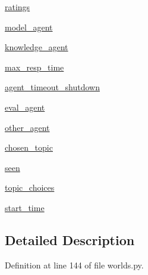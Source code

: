 \begin{DoxyCompactItemize}
\item 
\hyperlink{classprojects_1_1wizard__of__wikipedia_1_1mturk__evaluation__task_1_1worlds_1_1WizardEval_aacc518b7e3a5c1b7f937592864ae5e2d}{ratings}
\item 
\hyperlink{classprojects_1_1wizard__of__wikipedia_1_1mturk__evaluation__task_1_1worlds_1_1WizardEval_a55e5a388195e3eb5455bc3fdd004b5e0}{model\+\_\+agent}
\item 
\hyperlink{classprojects_1_1wizard__of__wikipedia_1_1mturk__evaluation__task_1_1worlds_1_1WizardEval_a0ff232b423606b2ac3b95fb9e0d9f820}{knowledge\+\_\+agent}
\item 
\hyperlink{classprojects_1_1wizard__of__wikipedia_1_1mturk__evaluation__task_1_1worlds_1_1WizardEval_acf3ad9fdd1d432a9a520ea8bce150f4f}{max\+\_\+resp\+\_\+time}
\item 
\hyperlink{classprojects_1_1wizard__of__wikipedia_1_1mturk__evaluation__task_1_1worlds_1_1WizardEval_aef19629b948f594f5db8b97a0a482c00}{agent\+\_\+timeout\+\_\+shutdown}
\item 
\hyperlink{classprojects_1_1wizard__of__wikipedia_1_1mturk__evaluation__task_1_1worlds_1_1WizardEval_a07a6ad3dcadff66b04e4e9eb652f4910}{eval\+\_\+agent}
\item 
\hyperlink{classprojects_1_1wizard__of__wikipedia_1_1mturk__evaluation__task_1_1worlds_1_1WizardEval_a18f6c2c8871d9f39ba0c7a205b05aa8e}{other\+\_\+agent}
\item 
\hyperlink{classprojects_1_1wizard__of__wikipedia_1_1mturk__evaluation__task_1_1worlds_1_1WizardEval_a72f089d7257435bf9e1cb20ba293d4ad}{chosen\+\_\+topic}
\item 
\hyperlink{classprojects_1_1wizard__of__wikipedia_1_1mturk__evaluation__task_1_1worlds_1_1WizardEval_a6295bb9c04061cacd467fbcb9c3ff6b6}{seen}
\item 
\hyperlink{classprojects_1_1wizard__of__wikipedia_1_1mturk__evaluation__task_1_1worlds_1_1WizardEval_a3777176fe6a2ef5586e2dbbe2b4e9894}{topic\+\_\+choices}
\item 
\hyperlink{classprojects_1_1wizard__of__wikipedia_1_1mturk__evaluation__task_1_1worlds_1_1WizardEval_a46e08a2e5573f3748e8fba9e8122931c}{start\+\_\+time}
\end{DoxyCompactItemize}


\subsection{Detailed Description}


Definition at line 144 of file worlds.\+py.



